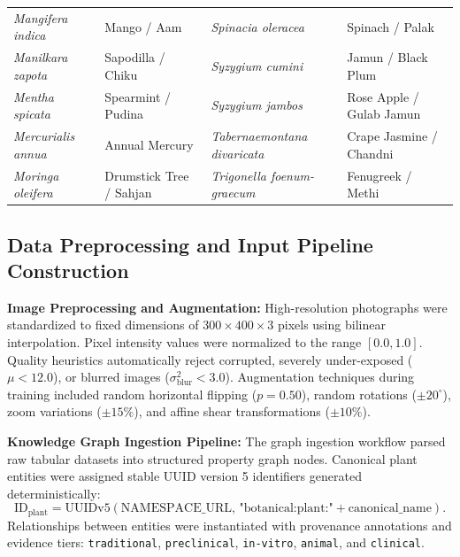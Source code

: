 \begin{table}[htbp]
\begin{tabular}{@{}llll@{}}
\textit{Mangifera indica} & Mango / Aam & \textit{Spinacia oleracea} & Spinach / Palak \\
\textit{Manilkara zapota} & Sapodilla / Chiku & \textit{Syzygium cumini} & Jamun / Black Plum \\
\textit{Mentha spicata} & Spearmint / Pudina & \textit{Syzygium jambos} & Rose Apple / Gulab Jamun \\
\textit{Mercurialis annua} & Annual Mercury & \textit{Tabernaemontana divaricata} & Crape Jasmine / Chandni \\
\textit{Moringa oleifera} & Drumstick Tree / Sahjan & \textit{Trigonella foenum-graecum} & Fenugreek / Methi \\
\hline
\end{tabular}
\end{table}

\subsection{Data Preprocessing and Input Pipeline Construction}

\textbf{Image Preprocessing and Augmentation:} High-resolution photographs were standardized to fixed dimensions of $300 \times 400 \times 3$ pixels using bilinear interpolation. Pixel intensity values were normalized to the range $[0.0, 1.0]$. Quality heuristics automatically reject corrupted, severely under-exposed ($\mu < 12.0$), or blurred images ($\sigma_{\text{blur}}^2 < 3.0$). Augmentation techniques during training included random horizontal flipping ($p = 0.50$), random rotations ($\pm 20^\circ$), zoom variations ($\pm 15\%$), and affine shear transformations ($\pm 10\%$).

\textbf{Knowledge Graph Ingestion Pipeline:} The graph ingestion workflow parsed raw tabular datasets into structured property graph nodes. Canonical plant entities were assigned stable UUID version 5 identifiers generated deterministically:
\begin{equation}
\mathrm{ID}_{\mathrm{plant}} = \mathrm{UUIDv5}\left(\mathrm{NAMESPACE\_URL},\, \text{"botanical:plant:"} + \text{canonical\_name}\right).
\label{eq:uuid_plant}
\end{equation}
Relationships between entities were instantiated with provenance annotations and evidence tiers: \texttt{traditional}, \texttt{preclinical}, \texttt{in-vitro}, \texttt{animal}, and \texttt{clinical}.

